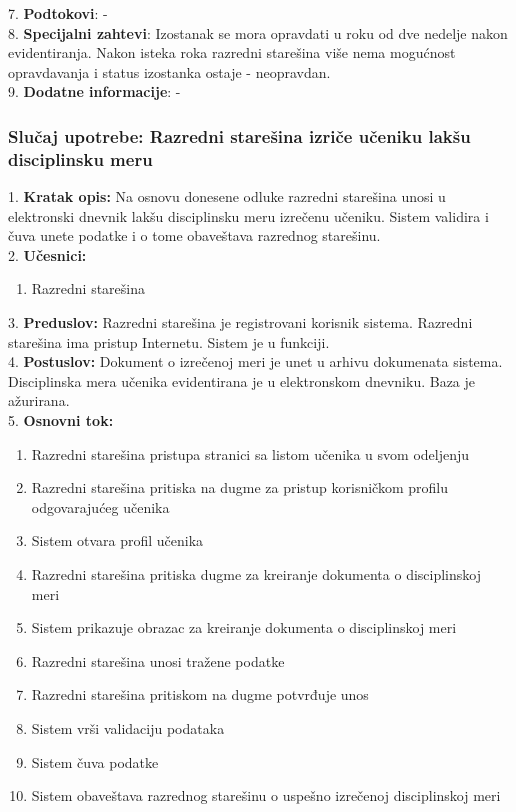\documentclass{article}
\begin{document}
7. \textbf{Podtokovi}: - \\

8. \textbf{Specijalni zahtevi}: Izostanak se mora opravdati u roku od dve nedelje nakon evidentiranja. Nakon isteka roka razredni starešina više nema mogućnost opravdavanja i status izostanka ostaje - neopravdan. \\

9. \textbf{Dodatne informacije}: - \\


\subsubsection{Slučaj upotrebe: Razredni starešina izriče učeniku lakšu disciplinsku meru}

1. \textbf{Kratak opis:} Na osnovu donesene odluke razredni starešina unosi u elektronski dnevnik lakšu disciplinsku meru izrečenu učeniku. Sistem validira i čuva unete podatke i o tome obaveštava razrednog starešinu. \\

2. \textbf{Učesnici:}
\begin{enumerate} [label=(\alph*)]
\item Razredni starešina
\end{enumerate} 

3. \textbf{Preduslov:} Razredni starešina je registrovani korisnik sistema. Razredni starešina ima pristup Internetu. Sistem je u funkciji. \\

4. \textbf{Postuslov:} Dokument o izrečenoj meri je unet u arhivu dokumenata sistema. Disciplinska mera učenika evidentirana je u elektronskom dnevniku. Baza je ažurirana. \\

5. \textbf{Osnovni tok:} 
\begin{enumerate} [label=(\alph*)]
\item Razredni starešina pristupa stranici sa listom učenika u svom odeljenju
\item Razredni starešina pritiska na dugme za pristup korisničkom profilu odgovarajućeg učenika
\item Sistem otvara profil učenika
\item Razredni starešina pritiska dugme za kreiranje dokumenta o disciplinskoj meri
\item Sistem prikazuje obrazac za kreiranje dokumenta o disciplinskoj meri 
\item Razredni starešina unosi tražene podatke
\item Razredni starešina pritiskom na dugme potvrđuje unos
\item Sistem vrši validaciju podataka
\item Sistem čuva podatke
\item Sistem obaveštava razrednog starešinu o uspešno izrečenoj disciplinskoj meri
\end{enumerate}
\end{document}
